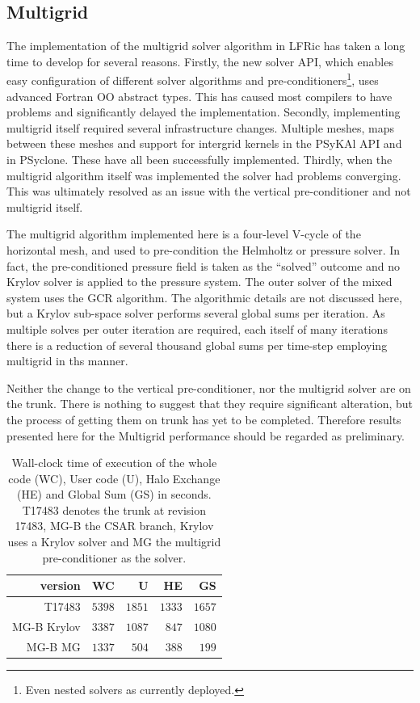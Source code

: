 \subsection{\label{sec:multigrid}Multigrid}
The implementation of the multigrid solver algorithm in LFRic has taken a
long time to develop for several reasons. Firstly, the new solver API,
which enables easy configuration of different solver algorithms and
pre-conditioners\footnote{Even nested solvers as currently deployed.},
uses advanced Fortran OO abstract types. This has caused most
compilers to have problems and significantly delayed the
implementation. Secondly, implementing multigrid itself required
several infrastructure changes. Multiple meshes, maps between these
meshes and support for intergrid kernels in the PSyKAl API and in
PSyclone. These have all been successfully implemented. Thirdly, when
the multigrid algorithm itself was implemented the solver had problems
converging.
This was ultimately resolved as an issue with the vertical
pre-conditioner and not multigrid itself. 

The multigrid algorithm implemented here is a four-level V-cycle of
the horizontal mesh, and used to pre-condition the Helmholtz or
pressure solver. In fact, the pre-conditioned pressure field is taken
as the ``solved'' outcome and no Krylov solver is applied
to the pressure system. The outer solver of the mixed system uses the
GCR algorithm. The algorithmic details are not discussed here, but a
Krylov sub-space solver performs several global sums per iteration. As
multiple solves per outer iteration are required, each itself of many
iterations there is a reduction of several thousand global sums per
time-step employing multigrid in ths manner.

Neither the change to the vertical pre-conditioner, nor the multigrid
solver are on the trunk. There is nothing to suggest that they require
significant alteration, but the process of getting them on trunk has
yet to be completed. Therefore results presented here for the
Multigrid performance should be regarded as preliminary.

\begin{table}
\centering
\caption{\label{tab:MG_data}Wall-clock time of execution of the whole code (WC), User
  code (U), Halo Exchange (HE) and Global Sum (GS) in seconds. T17483
  denotes the trunk at revision 17483, MG-B the CSAR branch,
  Krylov uses a Krylov solver and MG the multigrid pre-conditioner as
  the solver.
}
\begin{tabular}{r|rrrr}
version     & WC     & U      & HE     & GS \\\hline
T17483      & $5398$ & $1851$ & $1333$ & $1657$ \\
MG-B Krylov & $3387$ & $1087$ & $847$  & $1080$ \\
MG-B MG     & $1337$ & $504$  & $388$  & $199$ \\\hline
\end{tabular}
\end{table}

